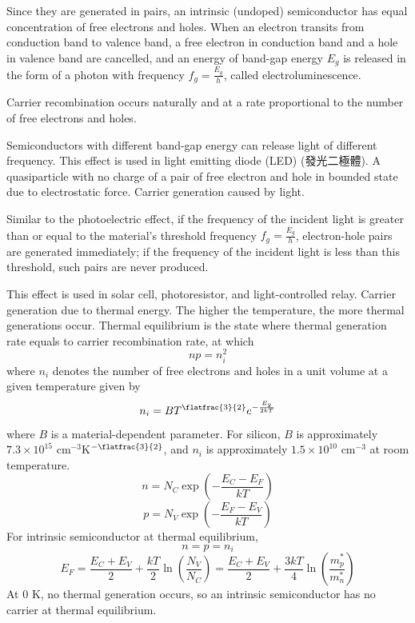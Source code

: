 \documentclass[a4paper,12pt]{report}
\begin{document}
Since they are generated in pairs, an intrinsic (undoped) semiconductor has equal concentration of free electrons and holes.
When an electron transits from conduction band to valence band, a free electron in conduction band and a hole in valence band are cancelled, and an energy of band-gap energy $E_g$ is released in the form of a photon with frequency $f_g=\frac{E_g}{h}$, called electroluminescence.

Carrier recombination occurs naturally and at a rate proportional to the number of free electrons and holes.

Semiconductors with different band-gap energy can release light of different frequency. This effect is used in light emitting diode (LED) (發光二極體).
A quasiparticle with no charge of a pair of free electron and hole in bounded state due to electrostatic force.
Carrier generation caused by light.

Similar to the photoelectric effect, if the frequency of the incident light is greater than or equal to the material's threshold frequency $f_g=\frac{E_g}{h}$, electron-hole pairs are generated immediately; if the frequency of the incident light is less than this threshold, such pairs are never produced.

This effect is used in solar cell, photoresistor, and light-controlled relay.
Carrier generation due to thermal energy. The higher the temperature, the more thermal generations occur.
Thermal equilibrium is the state where thermal generation rate equals to carrier recombination rate, at which
\[np=n_i^2\]
where $n_i$ denotes the number of free electrons and holes in a unit volume at a given temperature given by
\[n_i=BT^{\flatfrac{3}{2}}e^{-\frac{E_g}{2kT}}\]
where $B$ is a material-dependent parameter. For silicon, $B$ is approximately $7.3\times 10^{15}$ cm$^{-3}$K$^{-\flatfrac{3}{2}}$, and $n_i$ is approximately $1.5\times 10^{10}$ cm$^{-3}$ at room temperature.
\[n=N_C\exp(-\frac{E_C-E_F}{kT})\]
\[p=N_V\exp(-\frac{E_F-E_V}{kT})\]
For intrinsic semiconductor at thermal equilibrium,
\[n=p=n_i\]
\[E_F=\frac{E_C+E_V}{2}+\frac{kT}{2}\ln(\frac{N_V}{N_C})=\frac{E_C+E_V}{2}+\frac{3kT}{4}\ln(\frac{m_p^*}{m_n^*})\]
At 0 K, no thermal generation occurs, so an intrinsic semiconductor has no carrier at thermal equilibrium.
\end{document}
